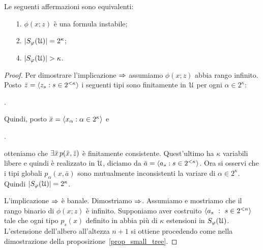 \begin{corollary}
Le seguenti affermazioni sono equivalenti:
\begin{itemize}
\item[1.] $\phi(x;z)$ \`e una formula instabile;
\item[2.] $|S_\varphi(\EuScript U)|=2^\kappa$;
\item[4.] $|S_\phi(\U)|>\kappa$.
\end{itemize}
\end{corollary}
\begin{proof}
Per dimostrare l'implicazione $\Rightarrow$ assumiamo $\phi(x;z)$ abbia rango infinito. Posto  $\bar z=\langle z_s:s\in2^{<\kappa}\rangle$ i seguenti tipi sono  finitamente in $\EuScript U$ per ogni $\alpha\in2^\kappa$:

.

Quindi, posto $\bar x=\langle x_\alpha:\alpha\in 2^\kappa\rangle$ e

.

otteniamo che $\exists \bar x\, p(\bar x,\bar z)$ \`e finitamente consistente. Quest'ultimo ha $\kappa$ variabili libere e quindi \`e realizzato in $\EuScript U$, diciamo da $\bar a=\langle a_s: s\in2^{<\kappa}\rangle$. Ora si osservi che i tipi globali $p_\alpha(x,\bar a)$ sono mutualmente inconsistenti la variare di $\alpha\in2^\kappa$. Quindi $|S_\varphi(\EuScript U)|=2^\kappa$. 

L'implicazione $\Rightarrow$ \`e banale. Dimostriamo $\Rightarrow$. 
% 
% 
% 
% 
Assumiamo  e mostriamo che il rango binario di $\phi(x;z)$ \`e infinito. Supponiamo aver costruito $\langle a_s\ :\ s\in2^{<n}\rangle$ tale che ogni tipo $p_s(x)$ definito in  abbia pi\`u di $\kappa$ estensioni in $S_\varphi(\EuScript U)$. L'estensione dell'albero all'altezza $n+1$ si ottiene procedendo come nella dimostrazione della proposizione~\ref{prop_small_tree}. 
\end{proof} 


